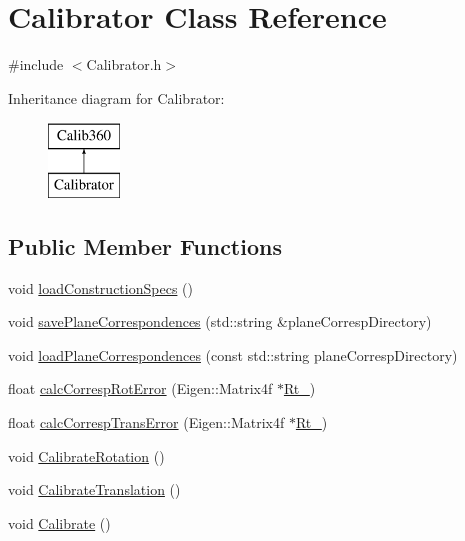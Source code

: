 \hypertarget{classCalibrator}{\section{Calibrator Class Reference}
\label{classCalibrator}
}


{\ttfamily \#include $<$Calibrator.\-h$>$}

Inheritance diagram for Calibrator\-:\begin{figure}[H]
\begin{center}
\leavevmode
\includegraphics[height=2.000000cm]{classCalibrator}
\end{center}
\end{figure}
\subsection*{Public Member Functions}
\begin{DoxyCompactItemize}
\item 
void \hyperlink{classCalibrator_a749ed4be8cd2b66416b954af8ef24a9f}{load\-Construction\-Specs} ()
\item 
void \hyperlink{classCalibrator_a8f5f7422d896db20aad3812051eeb92e}{save\-Plane\-Correspondences} (std\-::string \&plane\-Corresp\-Directory)
\item 
void \hyperlink{classCalibrator_a14899494a37a1e838e2f6717a7114a8f}{load\-Plane\-Correspondences} (const std\-::string plane\-Corresp\-Directory)
\item 
float \hyperlink{classCalibrator_ac95df4664b1ca9b1188caf9a877348d5}{calc\-Corresp\-Rot\-Error} (Eigen\-::\-Matrix4f $\ast$\hyperlink{classCalib360_a61dacdf729067dcea6d270f79e628b83}{Rt\-\_\-})
\item 
float \hyperlink{classCalibrator_ae6aef26dc04a71762fac9d4dab2513c5}{calc\-Corresp\-Trans\-Error} (Eigen\-::\-Matrix4f $\ast$\hyperlink{classCalib360_a61dacdf729067dcea6d270f79e628b83}{Rt\-\_\-})
\item 
void \hyperlink{classCalibrator_a958435e23a9f93cfac798925b1653171}{Calibrate\-Rotation} ()
\item 
void \hyperlink{classCalibrator_af896bad41d28ff7ce20d77361414edc6}{Calibrate\-Translation} ()
\item 
void \hyperlink{classCalibrator_a337977f493659555f73fb476c686bb3c}{Calibrate} ()
\end{DoxyCompactItemize}
